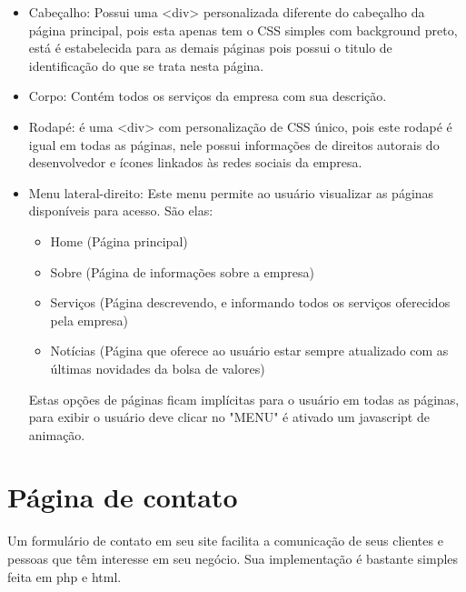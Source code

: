 \documentclass[
	12pt,				%
    oneside,			%
	a4paper,			%
	english,			%
	french,				%
	spanish,			%
	brazil,				%
	]{abntex2}
\begin{document}
\begin{itemize}
	\item{Cabeçalho: Possui uma <div> personalizada diferente do cabeçalho da página principal, pois esta apenas tem o CSS simples com background preto, está é estabelecida para as demais páginas pois possui o titulo de identificação do que se trata nesta página.}
	\item{Corpo: Contém todos os serviços da empresa com sua descrição.}
	\item{Rodapé: é uma <div> com personalização de CSS único, pois este rodapé é igual em todas as páginas, nele possui informações de direitos autorais do desenvolvedor e ícones linkados às redes sociais da empresa.}
	
	\item{Menu lateral-direito: Este menu permite ao usuário visualizar as páginas disponíveis para acesso. São elas: 
	
	\begin{itemize}
			
	\item{Home (Página principal)}
	\item{Sobre (Página de informações sobre a empresa)}
	\item{Serviços (Página descrevendo, e informando todos os serviços oferecidos pela empresa)} 		    \item{Notícias (Página que oferece ao usuário estar sempre atualizado com as últimas novidades da bolsa de valores)}
	
	\end{itemize}
	
	Estas opções de páginas ficam implícitas para o usuário em todas as páginas, para exibir o usuário deve clicar no "MENU" é ativado um javascript de animação.
}
\end{itemize}

\chapter{Página de contato}

Um formulário de contato em seu site facilita a comunicação de seus clientes e pessoas que têm interesse em seu negócio. Sua implementação é bastante simples feita em php e html.
\end{document}
